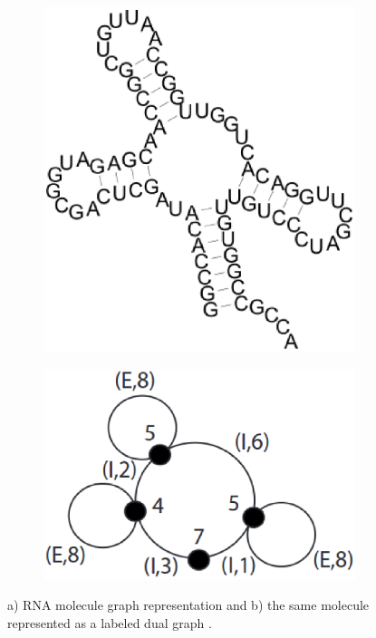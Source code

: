 \begin{figure}[ht]
    \centering
    \begin{subfigure}{.4\textwidth}
        \centering
        \includegraphics[width=\linewidth]{Figures/rna}
        \label{fig:rna}
        \caption{}
    \end{subfigure}
    \begin{subfigure}{.4\textwidth}
        \centering
        \includegraphics[width=\linewidth]{Figures/ldgrna}
        \label{fig:ldg}
        \caption{}
    \end{subfigure}
    \caption{a) RNA molecule graph representation and b) the same molecule represented
        as a labeled dual graph \cite{conf/psb/KarklinMH05}.}
    \label{fig:bio}
\end{figure}


